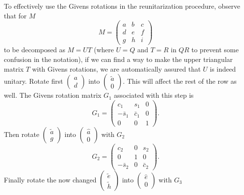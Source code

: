 \documentclass[a4paper,10pt]{article}
\begin{document}
To effectively use the Givens rotations in the reunitarization procedure, observe that for $M$
\begin{displaymath}
 M = \left(\begin{array}{ccc}a&b&c\\d&e&f\\g&h&i \end{array}\right)
\end{displaymath}
to be decomposed as $M=UT$ (where $U=Q$ and $T=R$ in $QR$ to prevent some confusion in the notation), if we can find a way to make the upper triangular matrix $T$ with Givens rotations, we are automatically assured that $U$ is indeed unitary. Rotate first $\left(\begin{array}{c}a\\d\end{array}\right)$ into $\left(\begin{array}{c}\tilde{a}\\0\end{array}\right)$. This will affect the rest of the row as well. The Givens rotation matrix $G_{1}$ associated with this step is
\begin{displaymath}
 G_{1} = \left(\begin{array}{ccc}c_{1}&s_{1}&0\\-\bar{s}_{1}&\bar{c}_{1}&0\\0&0&1 \end{array}\right).
\end{displaymath}
Then rotate $\left(\begin{array}{c}\tilde{a}\\g\end{array}\right)$ into $\left(\begin{array}{c}\hat{a}\\0\end{array}\right)$ with $G_{2}$
\begin{displaymath}
 G_{2} = \left(\begin{array}{ccc}c_{2}&0&s_{2}\\0&1&0\\-\bar{s}_{2}&0&\bar{c}_{2} \end{array}\right).
\end{displaymath}
Finally rotate the now changed $\left(\begin{array}{c}\tilde{e}\\ \tilde{h}\end{array}\right)$ into $\left(\begin{array}{c}\hat{e}\\0\end{array}\right)$ with $G_{3}$
\end{document}
